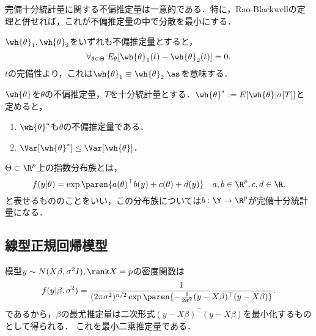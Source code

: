\documentclass[uplatex,dvipdfmx]{jsreport}
\begin{document}
\begin{lemma}
    完備十分統計量に関する不偏推定量は一意的である．特に，Rao-Blackwellの定理と併せれば，これが不偏推定量の中で分散を最小にする．
\end{lemma}
\begin{Proof}
    $\wh{\theta}_1,\wh{\theta}_2$をいずれも不偏推定量とすると，
    \[\forall_{\theta\in\Theta}\;E_\theta[\wh{\theta}_1(t)-\wh{\theta}_2(t)]=0.\]
    $t$の完備性より，これは$\wh{\theta}_1\equiv\wh{\theta}_2\;\as$を意味する．
\end{Proof}

\begin{theorem}
    $\wh{\theta}$を$\theta$の不偏推定量，$T$を十分統計量とする．$\wh{\theta}^*:=E[\wh{\theta}|\sigma[T]]$と定めると，
    \begin{enumerate}
        \item $\wh{\theta}^*$も$\theta$の不偏推定量である．
        \item $\Var[\wh{\theta}^*]\le\Var[\wh{\theta}]$．
    \end{enumerate}
\end{theorem}

\begin{example}[指数型分布族の完備十分統計量]
    $\Theta\subset\R^p$上の指数分布族とは，
    \[f(y|\theta)=\exp\paren{a(\theta)^\top b(y)+c(\theta)+d(y)}\quad a,b\in\R^p,c,d\in\R.\]
    と表せるもののことをいい，この分布族については$b:\Y\to\R^p$が完備十分統計量になる．
\end{example}

\subsection{線型正規回帰模型}

\begin{model}
    模型$y\sim N(X\beta,\sigma^2I),\rank X=p$の密度関数は
    \[f(y|\beta,\sigma^2)=\frac{1}{(2\pi\sigma^2)^{n/2}\exp\paren{-\frac{1}{2\sigma^2}(y-X\beta)^\top(y-X\beta)}}.\]
    であるから，$\beta$の最尤推定量は二次形式$(y-X\beta)^\top(y-X\beta)$を最小化するものとして得られる．
    これを最小二乗推定量である．
\end{model}
\end{document}
